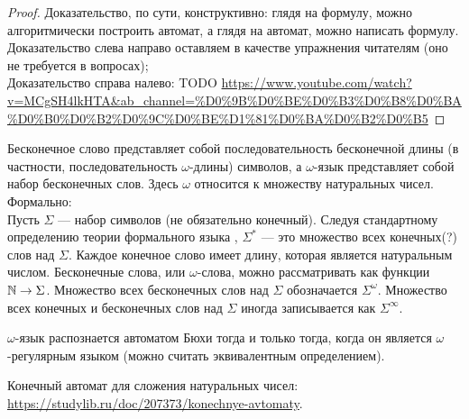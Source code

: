     \begin{proof}
        Доказательство, по сути, конструктивно: глядя на формулу, можно алгоритмически построить автомат, а глядя на автомат, можно написать формулу.\\
        Доказательство слева направо оставляем в качестве упражнения читателям (оно не требуется в вопросах);\\
        Доказательство справа налево: TODO \url{https://www.youtube.com/watch?v=MCgSH4lkHTA&ab_channel=%D0%9B%D0%BE%D0%B3%D0%B8%D0%BA%D0%B0%D0%B2%D0%9C%D0%BE%D1%81%D0%BA%D0%B2%D0%B5}
    \end{proof}

    
    
    \begin{Def}
        Бесконечное слово представляет собой последовательность бесконечной длины (в частности, последовательность $\omega$-длины) символов, а $\omega$-язык представляет собой набор бесконечных слов. Здесь $\omega$ относится к множеству натуральных чисел.\\
        Формально:\\
        Пусть $\Sigma$ — набор символов (не обязательно конечный). Следуя стандартному определению теории формального языка , $\Sigma^*$ --- это множество всех конечных(?) слов над $\Sigma$. Каждое конечное слово имеет длину, которая является натуральным числом. Бесконечные слова, или $\omega$-слова, можно рассматривать как функции $\mathbb{N} \rightarrow \Sigma$. Множество всех бесконечных слов над $\Sigma$ обозначается $\Sigma^\omega$. Множество всех конечных и бесконечных слов над $\Sigma$ иногда записывается как $\Sigma^\infty$.
    \end{Def}
    \begin{Def}

    \end{Def}
    \begin{Rem}
        $\omega$-язык распознается автоматом Бюхи тогда и только тогда, когда он является $\omega$-регулярным языком (можно считать эквивалентным определением).
    \end{Rem}

    
    \begin{Example}
        Конечный автомат для сложения натуральных чисел: \url{https://studylib.ru/doc/207373/konechnye-avtomaty}.
    \end{Example}
